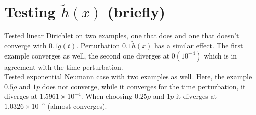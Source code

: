 \documentclass[11pt, a4paper]{article}
\theoremstyle{definition}
\begin{document}
\section{Testing $\tilde h(x)$ (briefly)}
Tested linear Dirichlet on two examples, one that does and one that doesn't converge with $0.1\tilde g(t)$. Perturbation $0.1 \tilde h(x)$ has a similar effect. The first example converges as well, the second one diverges at $0(10^{-4})$ which is in agreement with the time perturbation.\\
Tested exponential Neumann case with two examples as well. Here, the example $0.5 \rho$ and $1p$ does not converge, while it converges for the time perturbation, it diverges at $1.5961 \times 10^{-4}$. When choosing $0.25 \rho$ and $1p$ it diverges at $1.0326 \times 10^{-5}$ (almost converges).
\end{document}
